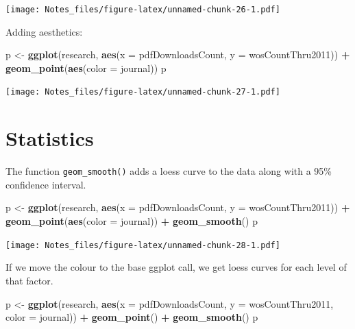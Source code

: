 \documentclass[
]{book}
\newenvironment{Shaded}{\begin{snugshade}}{\end{snugshade}}
\newcommand{\DataTypeTok}[1]{\textcolor[rgb]{0.13,0.29,0.53}{#1}}
\newcommand{\KeywordTok}[1]{\textcolor[rgb]{0.13,0.29,0.53}{\textbf{#1}}}
\newcommand{\NormalTok}[1]{#1}
\newcommand{\OperatorTok}[1]{\textcolor[rgb]{0.81,0.36,0.00}{\textbf{#1}}}
\newcommand{\StringTok}[1]{\textcolor[rgb]{0.31,0.60,0.02}{#1}}
\begin{document}
\texttt{[image: Notes\_files/figure-latex/unnamed-chunk-26-1.pdf]}

Adding aesthetics:

\begin{Shaded}
\begin{Highlighting}[]
\NormalTok{p <-}\StringTok{ }\KeywordTok{ggplot}\NormalTok{(research, }\KeywordTok{aes}\NormalTok{(}\DataTypeTok{x =}\NormalTok{ pdfDownloadsCount,}
                          \DataTypeTok{y =}\NormalTok{ wosCountThru2011)) }\OperatorTok{+}
\StringTok{  }\KeywordTok{geom_point}\NormalTok{(}\KeywordTok{aes}\NormalTok{(}\DataTypeTok{color =}\NormalTok{ journal))}
\NormalTok{p}
\end{Highlighting}
\end{Shaded}

\texttt{[image: Notes\_files/figure-latex/unnamed-chunk-27-1.pdf]}

\hypertarget{statistics}{%
\section{Statistics}\label{statistics}}

The function \texttt{geom\_smooth()} adds a loess curve to the data along with a 95\% confidence interval.

\begin{Shaded}
\begin{Highlighting}[]
\NormalTok{p <-}\StringTok{ }\KeywordTok{ggplot}\NormalTok{(research, }\KeywordTok{aes}\NormalTok{(}\DataTypeTok{x =}\NormalTok{ pdfDownloadsCount,}
                          \DataTypeTok{y =}\NormalTok{ wosCountThru2011)) }\OperatorTok{+}
\StringTok{  }\KeywordTok{geom_point}\NormalTok{(}\KeywordTok{aes}\NormalTok{(}\DataTypeTok{color =}\NormalTok{ journal)) }\OperatorTok{+}
\StringTok{  }\KeywordTok{geom_smooth}\NormalTok{()}
\NormalTok{p}
\end{Highlighting}
\end{Shaded}

\texttt{[image: Notes\_files/figure-latex/unnamed-chunk-28-1.pdf]}

If we move the colour to the base ggplot call, we get loess curves for each level of that factor.

\begin{Shaded}
\begin{Highlighting}[]
\NormalTok{p <-}\StringTok{ }\KeywordTok{ggplot}\NormalTok{(research, }\KeywordTok{aes}\NormalTok{(}\DataTypeTok{x =}\NormalTok{ pdfDownloadsCount, }
                          \DataTypeTok{y =}\NormalTok{ wosCountThru2011, }
                          \DataTypeTok{color =}\NormalTok{ journal)) }\OperatorTok{+}\StringTok{ }
\StringTok{  }\KeywordTok{geom_point}\NormalTok{() }\OperatorTok{+}\StringTok{ }
\StringTok{  }\KeywordTok{geom_smooth}\NormalTok{()}
\NormalTok{p}
\end{Highlighting}
\end{Shaded}
\end{document}
